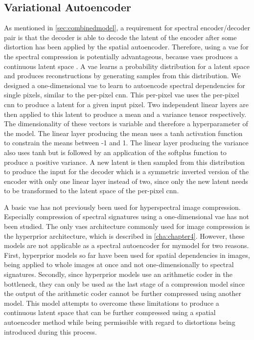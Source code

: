 \subsection{Variational Autoencoder \label{sec:vae}}
As mentioned in \autoref{sec:combinedmodel}, a requirement for spectral encoder/decoder pair is that the decoder is able to decode the latent of the encoder after some distortion has been applied by the spatial autoencoder. Therefore, using a \ac{vae} for the spectral compression is potentially advantageous, because \acp{vae} produces a continuous latent space \citep{song_latent_2019}. A \ac{vae} learns a probability distribution for a latent space and produces reconstructions by generating samples from this distribution. We designed a one-dimensional \ac{vae} to learn to autoencode spectral dependencies for single pixels, similar to the per-pixel \ac{cnn}. This per-pixel \ac{vae} uses the per-pixel \ac{cnn} to produce a latent for a given input pixel. Two independent linear layers are then applied to this latent to produce a mean and a variance tensor respectively. The dimensionality of these vectors is variable and therefore a hyperparameter of the model. The linear layer producing the mean uses a tanh activation function to constrain the means between -1 and 1. The linear layer producing the variance also uses tanh but is followed by an application of the softplus function to produce a positive variance. A new latent is then sampled from this distribution to produce the input for the decoder which is a symmetric inverted version of the encoder with only one linear layer instead of two, since only the new latent needs to be transformed to the latent space of the per-pixel \ac{cnn}.

A basic \ac{vae} has not previously been used for hyperspectral image compression. Especially compression of spectral signatures using a one-dimensional \ac{vae} has not been studied. The only \acp{vae} architecture commonly used for image compression is the hyperprior architecture, which is described in \autoref{cha:chapter4}. However, these models are not applicable as a spectral autoencoder for \ac{mymodel} for two reasons. First, hyperprior models so far have been used for spatial dependencies in images, being applied to whole images at once and not one-dimensionally to spectral signatures. Secondly, since hyperprior models use an arithmetic coder in the bottleneck, they can only be used as the last stage of a compression model since the output of the arithmetic coder cannot be further compressed using another model. This model attempts to overcome these limitations to produce a continuous latent space that can be further compressed using a spatial autoencoder method while being permissible with regard to distortions being introduced during this process.
